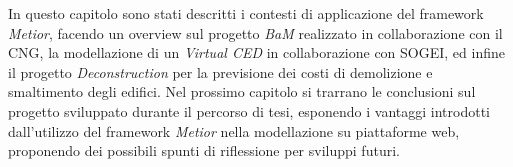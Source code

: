 In questo capitolo sono stati descritti i contesti di applicazione del framework
\emph{Metior}, facendo un overview sul progetto \emph{BaM} realizzato in collaborazione con il CNG,
la modellazione di un \emph{Virtual CED} in collaborazione con
SOGEI, ed infine il progetto \emph{Deconstruction} per la previsione dei costi di demolizione e smaltimento degli edifici.
Nel prossimo capitolo si trarrano le conclusioni sul progetto sviluppato durante il
percorso di tesi, esponendo i vantaggi introdotti dall’utilizzo del framework
\emph{Metior} nella modellazione su piattaforme web, proponendo dei possibili
spunti di riflessione per sviluppi futuri.
